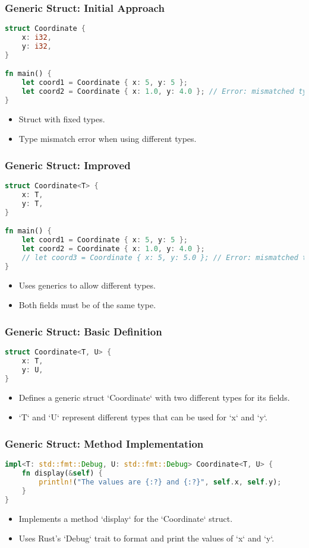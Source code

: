 \documentclass[aspectratio=169, table]{beamer}
\begin{document}
\begin{frame}[fragile]
\frametitle{Generic Struct: Initial Approach}
\begin{lstlisting}[language=Rust]
struct Coordinate {
	x: i32,
	y: i32,
}

fn main() {
	let coord1 = Coordinate { x: 5, y: 5 };
	let coord2 = Coordinate { x: 1.0, y: 4.0 }; // Error: mismatched types
}
\end{lstlisting}
\begin{itemize}
\item Struct with fixed types.
\item Type mismatch error when using different types.
\end{itemize}
\end{frame}

\begin{frame}[fragile]
\frametitle{Generic Struct: Improved}
\begin{lstlisting}[language=Rust]
struct Coordinate<T> {
	x: T,
	y: T,
}

fn main() {
	let coord1 = Coordinate { x: 5, y: 5 };
	let coord2 = Coordinate { x: 1.0, y: 4.0 };
	// let coord3 = Coordinate { x: 5, y: 5.0 }; // Error: mismatched types
}
\end{lstlisting}
\begin{itemize}
\item Uses generics to allow different types.
\item Both fields must be of the same type.
\end{itemize}
\end{frame}

\begin{frame}[fragile]
\frametitle{Generic Struct: Basic Definition}
\begin{lstlisting}[language=Rust]
struct Coordinate<T, U> {
	x: T,
	y: U,
}
\end{lstlisting}
\begin{itemize}
\item Defines a generic struct `Coordinate` with two different types for its fields.
\item `T` and `U` represent different types that can be used for `x` and `y`.
\end{itemize}
\end{frame}

\begin{frame}[fragile]
\frametitle{Generic Struct: Method Implementation}
\begin{lstlisting}[language=Rust]
impl<T: std::fmt::Debug, U: std::fmt::Debug> Coordinate<T, U> {
	fn display(&self) {
		println!("The values are {:?} and {:?}", self.x, self.y);
	}
}
\end{lstlisting}
\begin{itemize}
\item Implements a method `display` for the `Coordinate` struct.
\item Uses Rust's `Debug` trait to format and print the values of `x` and `y`.
\end{itemize}
\end{frame}
\end{document}
